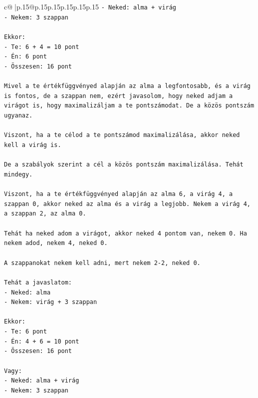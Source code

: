 \documentclass{article}
\begin{document}
{\begin{supertabular}{c@{$\;$}|p{.15\linewidth}@{}p{.15\linewidth}p{.15\linewidth}p{.15\linewidth}p{.15\linewidth}p{.15\linewidth}}
{{{\texttt{{-} Neked: alma + virág} \\
\texttt{{-} Nekem: 3 szappan} \\
\\ 
\texttt{Ekkor:} \\
\texttt{{-} Te: 6 + 4 = 10 pont} \\
\texttt{{-} Én: 6 pont} \\
\texttt{{-} Összesen: 16 pont} \\
\\ 
\texttt{Mivel a te értékfüggvényed alapján az alma a legfontosabb, és a virág is fontos, de a szappan nem, ezért javasolom, hogy neked adjam a virágot is, hogy maximalizáljam a te pontszámodat. De a közös pontszám ugyanaz.} \\
\\ 
\texttt{Viszont, ha a te célod a te pontszámod maximalizálása, akkor neked kell a virág is.} \\
\\ 
\texttt{De a szabályok szerint a cél a közös pontszám maximalizálása. Tehát mindegy.} \\
\\ 
\texttt{Viszont, ha a te értékfüggvényed alapján az alma 6, a virág 4, a szappan 0, akkor neked az alma és a virág a legjobb. Nekem a virág 4, a szappan 2, az alma 0.} \\
\\ 
\texttt{Tehát ha neked adom a virágot, akkor neked 4 pontom van, nekem 0. Ha nekem adod, nekem 4, neked 0.} \\
\\ 
\texttt{A szappanokat nekem kell adni, mert nekem 2{-}2, neked 0.} \\
\\ 
\texttt{Tehát a javaslatom:} \\
\texttt{{-} Neked: alma} \\
\texttt{{-} Nekem: virág + 3 szappan} \\
\\ 
\texttt{Ekkor:} \\
\texttt{{-} Te: 6 pont} \\
\texttt{{-} Én: 4 + 6 = 10 pont} \\
\texttt{{-} Összesen: 16 pont} \\
\\ 
\texttt{Vagy:} \\
\texttt{{-} Neked: alma + virág} \\
\texttt{{-} Nekem: 3 szappan} \\
\\ 
}}}
\end{supertabular}}
\end{document}
